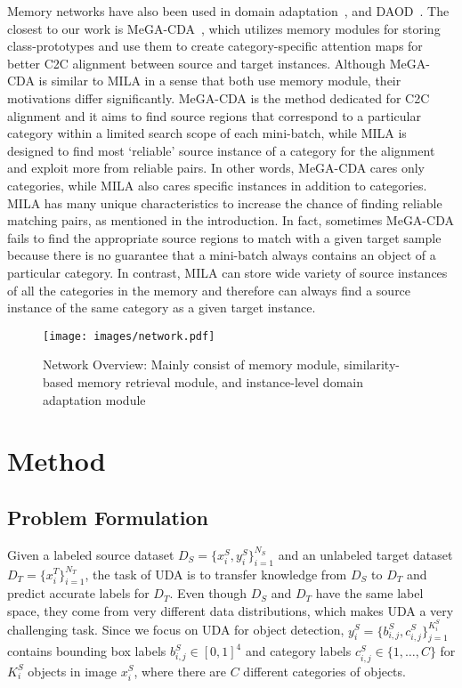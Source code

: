 \documentclass{bmvc2k}
\begin{document}
Memory networks have also been used in domain adaptation~\cite{memsac}, and DAOD~\cite{vs2021mega}. The closest to our work is MeGA-CDA~\cite{vs2021mega}, which utilizes memory modules for storing class-prototypes and use them to create category-specific attention maps for better C2C alignment between source and target instances.
Although MeGA-CDA is similar to MILA in a sense that both use memory module, their motivations differ significantly. 
MeGA-CDA is the method dedicated for C2C alignment and it aims to find source regions that correspond to a particular category within a limited search scope of each mini-batch, while MILA is designed to find most `reliable' source instance of a category for the alignment and exploit more from reliable pairs.
In other words, MeGA-CDA cares only categories, while MILA also cares specific instances in addition to categories.
MILA has many unique characteristics to increase the chance of finding reliable matching pairs, as mentioned in the introduction.
In fact, sometimes MeGA-CDA fails to find the appropriate source regions to match with a given target sample because there is no guarantee that a mini-batch always contains an object of a particular category.
In contrast, MILA can store wide variety of source instances of all the categories in the memory and therefore can always find a source instance of the same category as a given target instance.










\begin{figure*}[t!]
  \centering
  \texttt{[image: images/network.pdf]}
  \caption{Network Overview: Mainly consist of memory module,  similarity-based memory retrieval module, and instance-level domain adaptation module}
  \label{fig:fig2}
\end{figure*}




\section{Method}



\subsection{ Problem Formulation}\label{sec:problem}
Given a labeled source dataset $D_S = \{x^S_i, y^S_i\}_{i=1}^{N_S}$ and an unlabeled target dataset $D_T = \{x^T_i\}_{i=1}^{N_T}$, the task of UDA is to transfer knowledge from $D_S$ to $D_T$ and predict accurate labels for $D_T$. Even though $D_S$ and $D_T$ have the same label space, they come from very different data distributions, which makes UDA a very challenging task. Since we focus on UDA for object detection, $y^S_{i} = \{b^S_{i,j}, c^S_{i,j}\}_{j=1}^{K^S_i}$ contains bounding box labels $b^S_{i,j}\in [0, 1]^4$ and category labels $c^S_{i,j} \in \{1, \dots, C\}$ for $K^S_i$ objects in image $x^S_i$, where there are $C$ different categories of objects.
\end{document}
